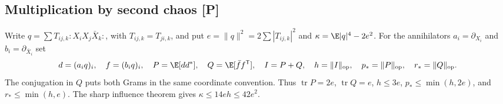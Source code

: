 \subsection{Multiplication by second chaos [P]}
\label{sec:quadratic-multiplication-refined}
Write $q=\sum T_{ij,k}{:}X_iX_j\bar X_k{:}$, with $T_{ij,k}=T_{ji,k}$,
and put $e=\|q\|^2=2\sum|T_{ij,k}|^2$ and
$\kappa=\E|q|^4-2e^2$. For the annihilators
$a_i=\partial_{X_i}$ and $b_i=\partial_{\bar X_i}$ set
\[
 d=(a_iq)_i,\quad f=(b_iq)_i,\quad
 P=\E[dd^*],\quad Q=\E[\bar f f^{\mathsf T}],\quad
 I=P+Q,\quad h=\|I\|_{\rm op},\quad
 p_*=\|P\|_{\rm op},\quad r_*=\|Q\|_{\rm op}.
\]
The conjugation in $Q$ puts both Grams in the same coordinate convention.
Thus $\operatorname{tr}P=2e$, $\operatorname{tr}Q=e$, $h\le3e$,
$p_*\le\min(h,2e)$, and $r_*\le\min(h,e)$.
The sharp influence theorem gives $\kappa\le14eh\le42e^2$.

